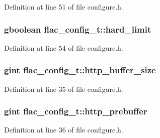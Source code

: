 Definition at line 51 of file configure.\+h.

\subsubsection[{\texorpdfstring{hard\+\_\+limit}{hard_limit}}]{\setlength{\rightskip}{0pt plus 5cm}gboolean flac\+\_\+config\+\_\+t\+::hard\+\_\+limit}\hypertarget{structflac__config__t_a9800e70f1e92d27c87a5de2e9d9aaffd}{}\label{structflac__config__t_a9800e70f1e92d27c87a5de2e9d9aaffd}


Definition at line 54 of file configure.\+h.

\subsubsection[{\texorpdfstring{http\+\_\+buffer\+\_\+size}{http_buffer_size}}]{\setlength{\rightskip}{0pt plus 5cm}gint flac\+\_\+config\+\_\+t\+::http\+\_\+buffer\+\_\+size}\hypertarget{structflac__config__t_aabc33c47559a22a5674c7f71c8ece1b3}{}\label{structflac__config__t_aabc33c47559a22a5674c7f71c8ece1b3}


Definition at line 35 of file configure.\+h.

\subsubsection[{\texorpdfstring{http\+\_\+prebuffer}{http_prebuffer}}]{\setlength{\rightskip}{0pt plus 5cm}gint flac\+\_\+config\+\_\+t\+::http\+\_\+prebuffer}\hypertarget{structflac__config__t_a252e88b5c990e39dd28290ab3b37404d}{}\label{structflac__config__t_a252e88b5c990e39dd28290ab3b37404d}


Definition at line 36 of file configure.\+h.

